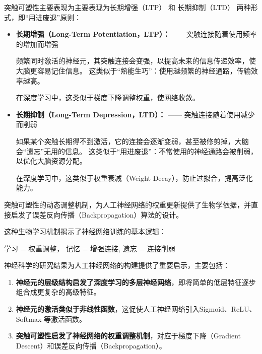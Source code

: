 突触可塑性主要表现为主要表现为长期增强（LTP） 和 长期抑制（LTD） 两种形式，即“用进废退”原则：\begin{itemize}
\item {\bf 长期增强（Long-Term Potentiation，LTP）：}—— 突触连接随着使用频率的增加而增强

频繁同时激活的神经元，其突触连接会变强，以提高未来的信息传递效率，使大脑更容易记住信息。
这类似于“熟能生巧”：使用越频繁的神经通路，传输效率越高。

在深度学习中，这类似于梯度下降调整权重，使网络收敛。

\item {\bf 长期抑制（Long-Term Depression，LTD）：} —— 突触连接随着使用减少而削弱

如果某个突触长期得不到激活，它的连接会逐渐变弱，甚至被修剪掉，大脑会“遗忘”无用的信息。
这类似于“用进废退”：不常使用的神经通路会被削弱，以优化大脑资源分配。

在深度学习中，这类似于权重衰减（Weight Decay），防止过拟合，提高泛化能力。
\end{itemize}

突触可塑性的动态调整机制，为人工神经网络的权重更新提供了生物学依据，并直接启发了误差反向传播（Backpropagation）算法的设计。

这种生物学习机制揭示了神经网络训练的基本逻辑：
\begin{center} 
学习 = 权重调整， \quad 
记忆 = 增强连接, \quad
遗忘 = 连接削弱
\end{center} 


神经科学的研究结果为人工神经网络的构建提供了重要启示，主要包括：

\begin{enumerate}
\item {\bf 神经元的层级结构启发了深度学习的多层神经网络}，即将简单的低层特征逐步组合成更复杂的高级特征。
\item {\bf 神经元的激活类似于非线性函数}，这促使人工神经网络引入Sigmoid、ReLU、Softmax 等激活函数。
\item {\bf 突触可塑性启发了神经网络的权重调整机制}，对应于梯度下降（Gradient Descent）和误差反向传播（Backpropagation）。
\end{enumerate}

